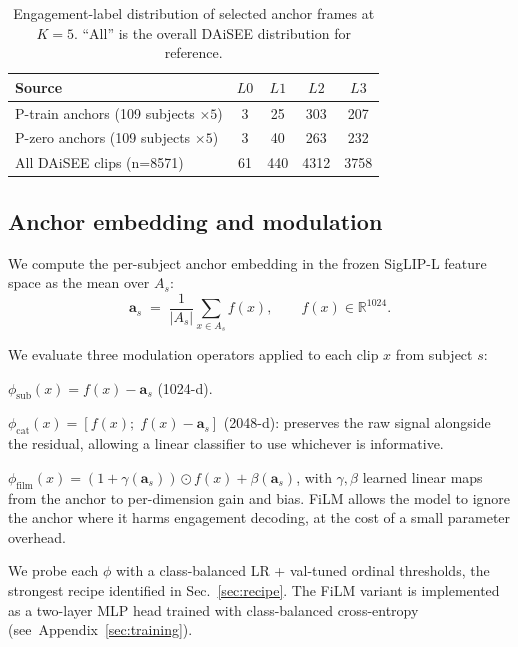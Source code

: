\begin{table}[t]
\caption{Engagement-label distribution of selected anchor frames at
$K=5$. ``All'' is the overall DAiSEE distribution for reference.}
\label{tab:anchor-dist}
\centering
\small
\begin{tabular}{lcccc}
\toprule
Source & $L0$ & $L1$ & $L2$ & $L3$\\
\midrule
P-train anchors (109 subjects $\times 5$) & 3 & 25 & 303 & 207\\
P-zero anchors (109 subjects $\times 5$) & 3 & 40 & 263 & 232\\
All DAiSEE clips (n=8571) & 61 & 440 & 4312 & 3758\\
\bottomrule
\end{tabular}
\end{table}

\subsection{Anchor embedding and modulation}
\label{sec:modulation}

We compute the per-subject anchor embedding in the frozen
SigLIP-L feature space as the mean over $A_s$:
\begin{equation}
\mathbf{a}_s \;=\; \frac{1}{|A_s|} \sum_{x \in A_s} f(x), \qquad
f(x) \in \mathbb{R}^{1024}.
\end{equation}

We evaluate three modulation operators applied to each clip $x$
from subject $s$:
\begin{description}\itemsep0pt
\item[\textsc{Sub}] $\phi_{\mathrm{sub}}(x) = f(x) - \mathbf{a}_s$
(1024-d).
\item[\textsc{Cat}] $\phi_{\mathrm{cat}}(x) = [f(x);\; f(x) - \mathbf{a}_s]$
(2048-d): preserves the raw signal alongside the residual,
allowing a linear classifier to use whichever is informative.
\item[\textsc{FiLM}] $\phi_{\mathrm{film}}(x) = (1 + \gamma(\mathbf{a}_s))
\odot f(x) + \beta(\mathbf{a}_s)$, with $\gamma, \beta$ learned linear
maps from the anchor to per-dimension gain and bias. FiLM allows the
model to ignore the anchor where it harms engagement decoding, at
the cost of a small parameter overhead.
\end{description}

We probe each $\phi$ with a class-balanced LR + val-tuned ordinal
thresholds, the strongest recipe identified in
Sec.~\ref{sec:recipe}. The FiLM variant is implemented as a
two-layer MLP head trained with class-balanced cross-entropy
(see~Appendix~\ref{sec:training}).

